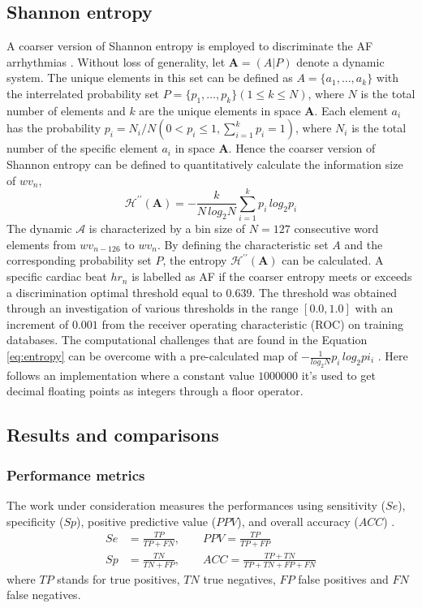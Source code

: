 \subsection{Shannon entropy}
\label{sec:entropy}
A coarser version of Shannon entropy is employed to discriminate the AF arrhythmias . Without loss of generality, let $\mathbf{A} = (A|P)$ denote a dynamic system. The unique elements in this set can be defined as $A = \{a_1, \ldots, a_k\}$ with the interrelated probability set $P = \{p_1, \ldots, p_k\} (1 \le k \le N)$, where $N$ is the total number of elements and $k$ are the unique elements in space $\mathbf{A}$. Each element $a_i$ has the probability $p_i = N_i/N (0 < p_i \le 1, \sum_{i=1}^{k}p_i=1)$, where $N_i$ is the total number of the specific element $a_i$ in space $\mathbf{A}$. Hence the coarser version of Shannon entropy can be defined to quantitatively calculate the information size of $wv_n$,
\begin{equation}\label{eq:entropy}
\mathcal{H}^{\prime\prime} (\mathbf{A}) = -\frac{k}{N \, log_2 N} \sum_{i=1}^{k}p_i \, log_2 p_i
\end{equation}
The dynamic $\mathcal{A}$ is characterized by a bin size of $N=127$ consecutive word elements from $wv_{n-126}$ to $wv_n$. By defining the characteristic set $A$ and the corresponding probability set $P$, the entropy $\mathcal{H}^{\prime\prime} (\mathbf{A})$ can be calculated. A specific cardiac beat $hr_n$ is labelled as AF if the coarser entropy meets or exceeds a discrimination optimal threshold equal to $0.639$. The threshold was obtained through an investigation of various thresholds in the range $[0.0, 1.0]$ with an increment of $0.001$ from the receiver operating characteristic (ROC) on training databases. 
The computational challenges that are found in the Equation \ref{eq:entropy} can be overcome with a pre-calculated map of $-\frac{1}{log_2 N}p_i \, log_2 pi_i$ \cite[p. 4]{zhou2015}. Here follows an implementation where a constant value $1000000$ it's used to get decimal floating points as integers through a floor operator.

\subsection{Results and comparisons}
\subsubsection{Performance metrics}
The work under consideration measures the performances using sensitivity ($Se$), specificity ($Sp$), positive predictive value ($PPV$), and overall accuracy ($ACC$) \cite[p. 6]{zhou2015}.
\begin{equation}
\begin{aligned} S e &=\frac{T P}{T P+F N},\qquad P P V=\frac{T P}{T P+F P} \\ S p &=\frac{T N}{T N+F P}, \qquad A C C=\frac{T P+T N}{T P+T N+F P+F N} \end{aligned}
\end{equation}
where $TP$ stands for true positives, $TN$ true negatives, $FP$ false positives and $FN$ false negatives.

